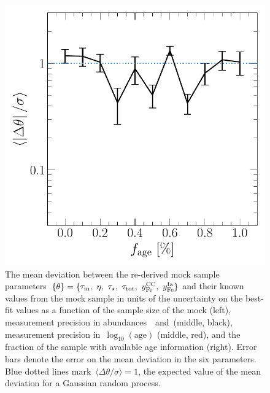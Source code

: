 \documentclass[ms.tex]{subfiles}
\begin{document}
\begin{figure}
\includegraphics[scale = 0.45]{dp_sigma_agefrac.pdf}
\caption{
The mean deviation between the re-derived mock sample parameters~$\{\theta\} =
\{\tau_\text{in},~\eta,~\tau_\star,~\tau_\text{tot},~y_\text{Fe}^\text{CC},~y_\text{Fe}^\text{Ia}\}$ and
their known values from the mock sample in units of the uncertainty on the
best-fit values as a function of the sample size of the mock (left),
measurement precision in abundances~\feh~and~\afe (middle, black),
measurement precision in~$\log_{10}(\text{age})$ (middle, red),
and the fraction of the sample with available age information (right).
Error bars denote the error on the mean deviation in the six parameters.
Blue dotted lines mark~$\langle\Delta\theta/\sigma\rangle = 1$, the
expected value of the mean deviation for a Gaussian random process.
}
\label{fig:dp_sigma}
\end{figure}
\end{document}
